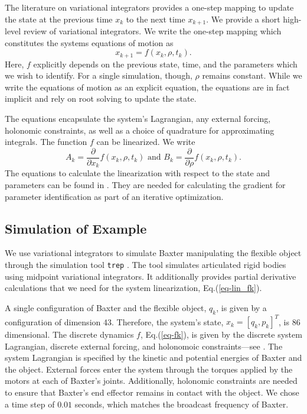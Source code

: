 \documentclass[runningheads,a4paper]{llncs}
\begin{document}
The literature on variational integrators \cite{marsden_west} provides a one-step mapping to update the state at the previous time $x_k$ to the next time $x_{k+1}$.  We provide a short high-level review of variational integrators.  We write the one-step mapping which constitutes the systems equations of motion as 
\begin{equation}
x_{k+1} = f(x_k,\rho,t_k).
\label{eq-fk}
\end{equation}
Here, $f$ explicitly depends on the previous state, time, and the parameters which we wish to identify. For a single simulation, though, $\rho$ remains constant.  While we write the equations of motion as an explicit equation, the equations are in fact implicit and rely on root solving to update the state. 

The equations encapsulate the system's Lagrangian, any external forcing, holonomic constraints, as well as a choice of quadrature for approximating integrals.  The function $f$ can be linearized. We write 
\begin{equation}
A_k = \frac{\partial}{\partial x_k}f(x_k,\rho,t_k) \textrm{ and } B_k = \frac{\partial}{\partial \rho}f(x_k,\rho,t_k).
\label{eq-lin_fk}
\end{equation}
The equations to calculate the linearization with respect to the state and parameters can be found in \cite{caldwell_coleman_correll_iros}. They are needed for calculating the gradient for parameter identification as part of an iterative optimization.

\subsection{Simulation of Example}
We use variational integrators to simulate Baxter manipulating the flexible object through the simulation tool \texttt{trep} \cite{johnson_murphey_scalable}.  The tool simulates articulated rigid bodies using midpoint variational integrators.  It additionally provides partial derivative calculations that we need for the system linearization, Eq.(\ref{eq-lin_fk}). 

A single configuration of Baxter and the flexible object, $q_k$, is given by a configuration of dimension 43. Therefore, the system's state,  $x_k = [q_k,p_k]^T$, is 86 dimensional. The discrete dynamics $f$, Eq.(\ref{eq-fk}), is given by the discrete system Lagrangian, discrete external forcing, and holonomoic constraints---see \cite{caldwell_coleman_correll_iros,marsden_west}.  The system Lagrangian is specified by the kinetic and potential energies of Baxter and the object.  External forces enter the system through the torques applied by the motors at each of Baxter's joints.  Additionally, holonomic constraints are needed to ensure that Baxter's end effector remains in contact with the object.  We chose a time step of $0.01$ seconds, which matches the broadcast frequency of Baxter. 
\end{document}
